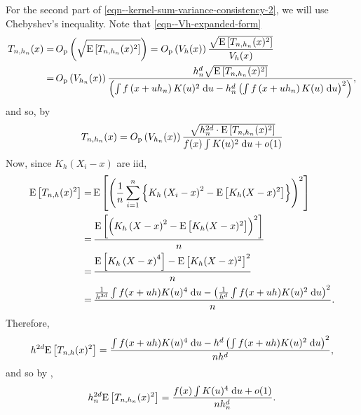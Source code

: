 For the second part of \eqref{eqn--kernel-sum-variance-consistency-2}, we will
use Chebyshev's inequality.
Note that \eqref{eqn--Vh-expanded-form}
\begin{align*}
  T_{n, h_{n}} (x) =
  & \, O_{\mathrm{p}} \left( \sqrt{\mathrm{E} \left[ T_{n, h_{n}} (x)^{2} \right]}
  \right) = O_{\mathrm{p}} \left( V_{h} (x) \right) \frac{\sqrt{\mathrm{E} \left[ T_{n,
  h_{n}} (x)^{2} \right]}}{V_{h} (x)} \\
  =
  & \, O_{\mathrm{p}} \left( V_{h_{n}} (x) \right) \frac{h_{n}^{d}
  \sqrt{\mathrm{E} \left[ T_{n, h_{n}} (x)^{2} \right]}}{\left( \int f \left( x + u
  h_{n} \right) K (u)^{2} \; \mathrm{d} u - h_{n}^{d} \left( \int f \left( x + u
  h_{n} \right) K (u) \; \mathrm{d} u \right)^{2} \right)},
\end{align*}
and so, by 
\begin{equation}
  T_{n, h_{n}} (x) = O_{\mathrm{p}} \left( V_{h_{n}} (x) \right)
  \frac{\sqrt{h_{n}^{2 d} \cdot \mathrm{E} \left[ T_{n, h_{n}} (x)^{2} \right]}}{f (x)
  \int K (u)^{2} \; \mathrm{d} u + o (1)}
  \label{eqn--kernel-sum-variance-consistency-Tnh-1}
\end{equation}
Now, since \(K_{h} \left( X_{i} - x \right)\) are iid,
\begin{align*}
  \mathrm{E} \left[ T_{n, h} (x)^{2} \right] =
  & \, \mathrm{E} \left[ \left( \frac{1}{n} \sum_{i = 1}^{n} \left\{ K_{h} \left( X_{i}
  - x \right)^{2} - \mathrm{E} \left[ K_{h} (X - x)^{2} \right] \right\} \right)^{2}
  \right] \\
  =
  & \, \frac{\mathrm{E} \left[ \left( K_{h} \left( X - x \right)^{2} - \mathrm{E} \left[
  K_{h} (X - x)^{2} \right] \right)^{2} \right]}{n} \\
  =
  & \, \frac{\mathrm{E} \left[ K_{h} \left( X - x \right)^{4} \right] - \mathrm{E} \left[ K_{h}
  (X - x)^{2} \right]^{2}}{n} \\
  =
  & \, \frac{\frac{1}{h^{3 d}} \int f (x + u h) K (u)^{4} \; \mathrm{d} u
  - \left( \frac{1}{h^{d}} \int f (x + u h) K (u)^{2} \; \mathrm{d} u
  \right)^{2}}{n}.
\end{align*}
Therefore,
\begin{equation*}
  h^{2 d} \mathrm{E} \left[ T_{n, h} (x)^{2} \right] =
  \frac{\int f (x + u h) K (u)^{4} \; \mathrm{d} u - h^{d} \left( \int
  f (x + u h) K (u)^{2} \; \mathrm{d} u \right)^{2}}{n h^{d}},
\end{equation*}
and so by ,
\begin{equation}
  h_{n}^{2 d} \mathrm{E} \left[ T_{n, h_{n}} (x)^{2} \right] = \frac{f (x) \int K
  (u)^{4} \; \mathrm{d} u + o (1)}{n h_{n}^{d}}.
  \label{eqn--kernel-sum-variance-consistency-Tnh-2}
\end{equation}
